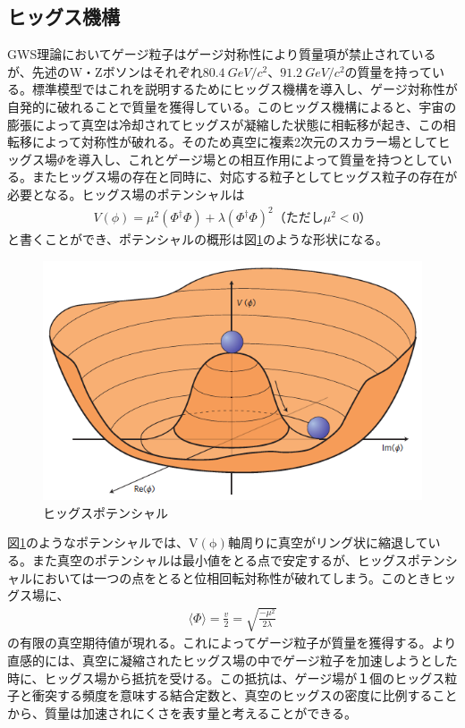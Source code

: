 \subsection{ヒッグス機構}
GWS理論においてゲージ粒子はゲージ対称性により質量項が禁止されているが、先述のW・Zボソンはそれぞれ$\SI{80.4}{GeV/c^2}$、$\SI{91.2}{GeV/c^2}$の質量を持っている。標準模型ではこれを説明するためにヒッグス機構を導入し、ゲージ対称性が自発的に破れることで質量を獲得している。このヒッグス機構によると、宇宙の膨張によって真空は冷却されてヒッグスが凝縮した状態に相転移が起き、この相転移によって対称性が破れる。そのため真空に複素2次元のスカラー場としてヒッグス場$\Phi$を導入し、これとゲージ場との相互作用によって質量を持つとしている。またヒッグス場の存在と同時に、対応する粒子としてヒッグス粒子の存在が必要となる。ヒッグス場のポテンシャル\cite{gaugehiggs}は
\begin{align}
V(\phi) = {\mu}^2({\Phi}^\dag \Phi) + \lambda ({\Phi}^\dag \Phi)^2　（ただし{\mu}^2 < 0）
\end{align}
と書くことができ、ポテンシャルの概形は図\ref{higgspotential}のような形状になる。
\begin{figure}[H]
	\begin{center}
 \includegraphics[keepaspectratio, scale=0.3]
 	{Figure/Introduction/higgspotential.png}
 		\caption{ヒッグスポテンシャル\cite{higgspotential}}
 		\label{higgspotential}
	\end{center}
\end{figure}

図\ref{higgspotential}のようなポテンシャルでは、$\mathrm{V(\phi)}$軸周りに真空がリング状に縮退している。また真空のポテンシャルは最小値をとる点で安定するが、ヒッグスポテンシャルにおいては一つの点をとると位相回転対称性が破れてしまう。このときヒッグス場に、
\begin{align}
\label{higgsvalue}
\langle \Phi \rangle = \frac{v}{2} = \sqrt{\frac{-{\mu}^2}{2\lambda}}
\end{align}
の有限の真空期待値が現れる。これによってゲージ粒子が質量を獲得する。より直感的には、真空に凝縮されたヒッグス場の中でゲージ粒子を加速しようとした時に、ヒッグス場から抵抗を受ける。この抵抗は、ゲージ場が１個のヒッグス粒子と衝突する頻度を意味する結合定数と、真空のヒッグスの密度に比例することから、質量は加速されにくさを表す量と考えることができる。

